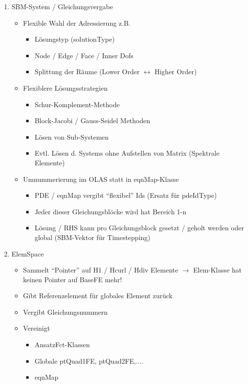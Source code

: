 \begin{enumerate}
\item SBM-System / Gleichungsvergabe

\begin{itemize}
\item Flexible Wahl der Adressierung z.B.
\begin{itemize}
\item Lösungstyp (solutionType)
\item Node / Edge / Face / Inner Dofs
\item Splittung der Räume (Lower Order $\leftrightarrow$ Higher Order)
\end{itemize}

\item Flexiblere Lösungsstrategien
\begin{itemize}
\item Schur-Komplement-Methode
\item Block-Jacobi / Gauss-Seidel Methoden
\item Lösen von Sub-Systemen
\item Evtl. Lösen d. Systems ohne Aufstellen von Matrix (Spektrale Elemente)
\end{itemize}

\item Umnummerierung im OLAS statt in eqnMap-Klasse
\begin{itemize}
\item PDE / eqnMap vergibt ``flexibel'' Ids (Ersatz für pdeIdType)
\item Jeder dieser Gleichungsblöcke wird hat Bereich 1-n

\item Lösung /  RHS kann  pro Gleichungsblock  gesetzt /  geholt werden  oder
  global (SBM-Vektor für Timestepping)
\end{itemize}

\end{itemize}

\item ElemSpace
\begin{itemize}
\item  Sammelt  ``Pointer'' auf  H1  /  Hcurl  / Hdiv  Elemente  $\rightarrow$
  Elem-Klasse hat keinen Pointer auf BaseFE mehr!

\item Gibt Referenzelement für globales Element zurück
\item Vergibt Gleichungsnummern 
\item Vereinigt
\begin{itemize}
\item AnsatzFct-Klassen
\item Globale ptQuad1FE, ptQuad2FE,....
\item eqnMap
\end{itemize}


\end{itemize}
\end{enumerate}
